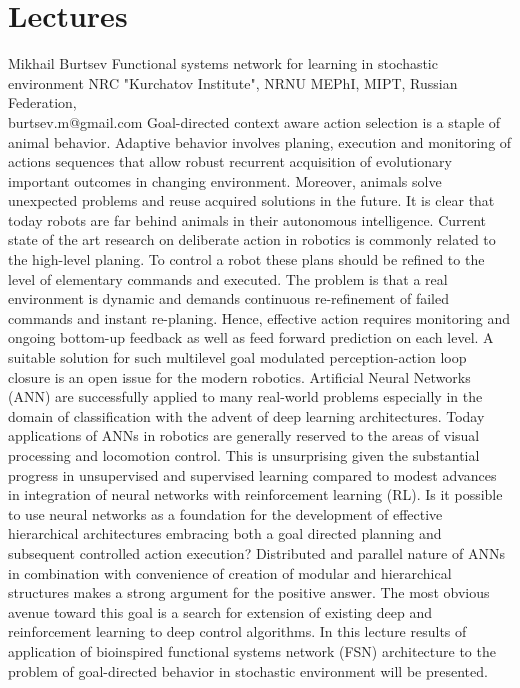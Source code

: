 \documentclass[10pt,fleqn,openany]{book} %
\begin{document}


\chapter{Lectures}

\begin{enumerate}
	\paperabstract
		{Mikhail Burtsev}
		{Functional systems network for learning in stochastic environment}
		{NRC "Kurchatov Institute", NRNU MEPhI, MIPT, Russian Federation,\\burtsev.m@gmail.com}
		{
			Goal-directed context aware action selection is a staple of animal behavior. Adaptive behavior involves planing, execution and monitoring of actions sequences that allow robust recurrent acquisition of evolutionary important outcomes in changing environment. Moreover, animals solve unexpected problems and reuse acquired solutions in the future. It is clear that today robots are far behind animals in their autonomous intelligence. Current state of the art research on deliberate action in robotics is commonly related to the high-level planing. To control a robot these plans should be refined to the level of elementary commands and executed. The problem is that a real environment is dynamic and demands continuous re-refinement of failed commands and instant re-planing. Hence, effective action requires monitoring and ongoing bottom-up feedback as well as feed forward prediction on each level. A suitable solution for such multilevel goal modulated perception-action loop closure is an open issue for the modern robotics. Artificial Neural Networks (ANN) are successfully applied to many real-world problems especially in the domain of classification with the advent of deep learning architectures. Today applications of ANNs in robotics are generally reserved to the areas of visual processing and locomotion control. This is unsurprising given the substantial progress in unsupervised and supervised learning compared to modest advances in integration of neural networks with reinforcement learning (RL). Is it possible to use neural networks as a foundation for the development of effective hierarchical architectures embracing both a goal directed planning and subsequent controlled action execution? Distributed and parallel nature of ANNs in combination with convenience of creation of modular and hierarchical structures makes a strong argument for the positive answer. The most obvious avenue toward this goal is a search for extension of existing deep and reinforcement learning to deep control algorithms. In this lecture results of application of bioinspired functional systems network (FSN) architecture to the problem of goal-directed behavior in stochastic environment will be presented.}
		

\end{enumerate}
\end{document}
